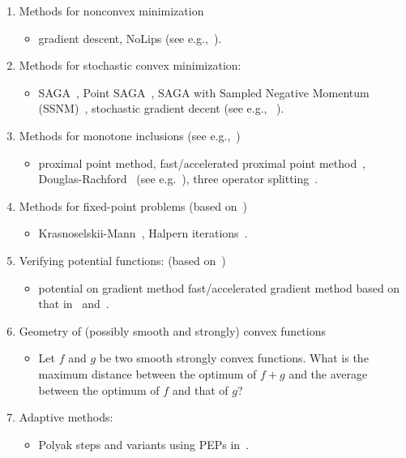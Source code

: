 \documentclass[11pt,a4paper]{article}
\begin{document}
\begin{enumerate}
\begin{itemize}
	\end{itemize}
	\item Methods for nonconvex minimization
	\begin{itemize}
		\item gradient descent, NoLips (see e.g.,~\cite{bolte2018first}).
	\end{itemize}
	\item Methods for stochastic convex minimization:
	\begin{itemize}
		\item SAGA~\cite{defazio2014saga}, Point SAGA~\cite{defazio2016simple}, SAGA with Sampled Negative Momentum (SSNM)~\cite{pmlr-v89-zhou19c}, stochastic gradient decent (see e.g.,~ \cite{moulines2011non}).
	\end{itemize}
	\item Methods for monotone inclusions (see e.g.,~\cite{bauschke2011convex,ryu2016primer})
	\begin{itemize}
		\item proximal point method, fast/accelerated proximal point method~\cite{kim2019accelerated}, Douglas-Rachford~\cite{douglas1956,moursi2019douglas} (see e.g.~\cite{bauschke2017douglas}), three operator splitting~\cite{davis2017three}.
	\end{itemize}
	\item Methods for fixed-point problems (based on~\cite{lieder2017convergence,lieder2018})
	\begin{itemize}
		\item Krasnoselskii-Mann~\cite{mann1953mean}, Halpern iterations~\cite{halpern1967fixed}.
	\end{itemize}
	\item Verifying potential functions: (based on~\cite{pmlr-v99-taylor19a})
	\begin{itemize}
		\item potential on gradient method fast/accelerated gradient method based on that in~\cite{bansal2017potential} and~\cite{pmlr-v99-taylor19a}.
	\end{itemize}
	\item Geometry of (possibly smooth and strongly) convex functions
	\begin{itemize}
		\item Let $f$ and $g$ be two smooth strongly convex functions. What is the maximum distance between the optimum of $f+g$ and the average between the optimum of $f$ and that of $g$?
	\end{itemize}
	\item Adaptive methods:
	\begin{itemize}
		\item Polyak steps and variants using PEPs in~\cite{Barre2020Polyak}.
	\end{itemize}
\end{enumerate}
\end{document}
